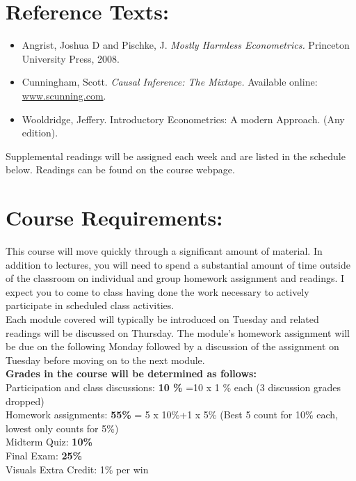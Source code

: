 \documentclass[a4paper, 10pt]{article}
\begin{document}
\section*{Reference Texts:}
\begin{itemize}
\item \normalsize Angrist, Joshua D and Pischke, J. \textit{Mostly Harmless Econometrics.} Princeton University Press, 2008. \\
\item \normalsize Cunningham, Scott. \textit{Causal Inference: The Mixtape.} Available online: \href{www.scunning.com}{www.scunning.com}.\\
\item \normalsize Wooldridge, Jeffery. Introductory Econometrics: A modern Approach. (Any edition). \\
\end{itemize}

\noindent Supplemental readings will be assigned each week and are listed in the schedule below. Readings can be found on the course webpage.\\

\section*{Course Requirements:}

This course will move quickly through a significant amount of material. In addition to lectures, you will need to spend a substantial amount of time outside of the classroom on individual and group homework assignment and readings. I expect you to come to class having done the work necessary to actively participate in scheduled class activities. \\

\noindent Each module covered will typically be introduced on Tuesday and related readings will be discussed on Thursday. The module's homework assignment will be due on the following Monday followed by a discussion of the assignment on Tuesday before moving on to the next module. \\

\noindent \textbf{Grades in the course will be determined as follows:}\\
\noindent Participation and class discussions: \textbf{10 \%} =10 x 1 \% each (3 discussion grades dropped)\\
Homework assignments: \textbf{55\%} = 5 x 10\%+1 x 5\% (Best 5 count for 10\% each, lowest only counts for 5\%)\\
Midterm Quiz:  \textbf{10\%}\\
Final Exam: \textbf{25\%}\\
Visuals Extra Credit: 1\% per win\\ 
\end{document}
